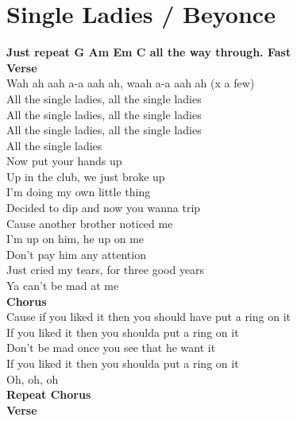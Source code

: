 \section{Single Ladies / Beyonce}\label{sec:singleladies}

\Gmajor
\Aminor
\EminorEasy
\Cmajor

\textbf{Just repeat G Am Em C all the way through. Fast}\\
\textbf{Verse}\\
Wah ah aah a-a aah ah, waah a-a aah ah (x a few)\\
All the single ladies, all the single ladies\\
All the single ladies, all the single ladies\\
All the single ladies, all the single ladies\\
All the single ladies\\
Now put your hands up\\
Up in the club, we just broke up\\
I'm doing my own little thing\\
Decided to dip and now you wanna trip\\
Cause another brother noticed me\\
I'm up on him, he up on me\\
Don't pay him any attention\\
Just cried my tears, for three good years\\
Ya can't be mad at me\\
\textbf{Chorus}\\
Cause if you liked it then you should have put a ring on it\\
If you liked it then you shoulda put a ring on it\\
Don't be mad once you see that he want it\\
If you liked it then you shoulda put a ring on it\\
Oh, oh, oh   \\
\textbf{Repeat Chorus}\\
\textbf{Verse}\\
